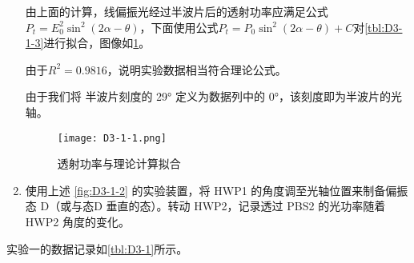 \documentclass[dvipsnames, svgnames,a4paper,11pt]{article}
\begin{document}
\begin{enumerate}
			由上面的计算，线偏振光经过半波片后的透射功率应满足公式 $P_t = E_0^2 \sin^2(2 \alpha - \theta)$，下面使用公式$ P_t = P_0 \sin^2(2\alpha - \theta) + C $对\cref{tbl:D3-1-3}进行拟合，图像如\cref{fig:D3-1-1}。

			由于$R^2 = 0.9816$，说明实验数据相当符合理论公式。

			由于我们将 半波片刻度的 29° 定义为数据列中的 0°，该刻度即为半波片的光轴。

			\begin{figure}[H]
				\centering
				\texttt{[image: D3-1-1.png]}
				\caption{透射功率与理论计算拟合}
				\label{fig:D3-1-1}
			\end{figure}



			\item 使用上述 \cref{fig:D3-1-2} 的实验装置，将 HWP1 的角度调至光轴位置来制备偏振态 D（或与态D 垂直的态）。转动 HWP2，记录透过 PBS2 的光功率随着 HWP2 角度的变化。
			
		\end{enumerate}

			实验一的数据记录如\cref{tbl:D3-1}所示。
\end{document}
